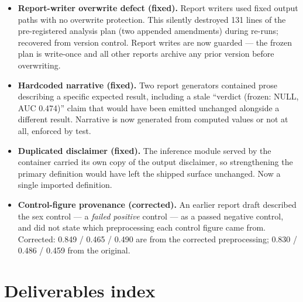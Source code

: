 \documentclass[11pt]{article}
\begin{document}
\begin{itemize}[leftmargin=1.2cm]
  \item \textbf{Report-writer overwrite defect (fixed).} Report writers used
        fixed output paths with no overwrite protection. This silently destroyed
        131 lines of the pre-registered analysis plan (two appended amendments)
        during re-runs; recovered from version control. Report writes are now
        guarded --- the frozen plan is write-once and all other reports archive
        any prior version before overwriting.
  \item \textbf{Hardcoded narrative (fixed).} Two report generators contained
        prose describing a specific expected result, including a stale
        ``verdict (frozen: NULL, AUC 0.474)'' claim that would have been emitted
        unchanged alongside a different result. Narrative is now generated from
        computed values or not at all, enforced by test.
  \item \textbf{Duplicated disclaimer (fixed).} The inference module served by
        the container carried its own copy of the output disclaimer, so
        strengthening the primary definition would have left the shipped surface
        unchanged. Now a single imported definition.
  \item \textbf{Control-figure provenance (corrected).} An earlier report draft
        described the sex control --- a \emph{failed positive} control --- as a
        passed negative control, and did not state which preprocessing each
        control figure came from. Corrected: 0.849 / 0.465 / 0.490 are from the
        corrected preprocessing; 0.830 / 0.486 / 0.459 from the original.
\end{itemize}

\section{Deliverables index}
\end{document}
